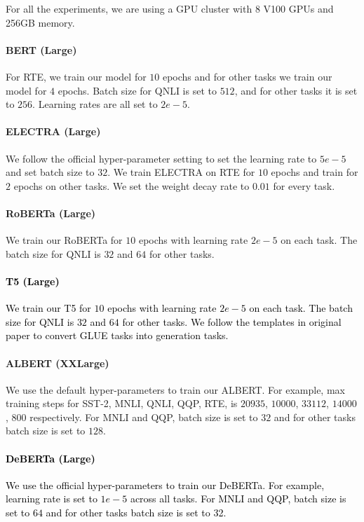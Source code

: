 \documentclass{article}
\newcommand{\m}[1]{{\textcolor{black}{{#1}}}}
\begin{document}
For all the experiments, we are using a GPU cluster with 8 V100 GPUs and 256GB memory.


\paragraph{BERT (Large)} For RTE, we train our model for $10$ epochs and for other tasks we train our model for $4$ epochs. Batch size for QNLI is set to $512$, and for other tasks it is set to $256$. Learning rates are all set to $2e-5$.

\paragraph{ELECTRA (Large)} We follow the official hyper-parameter setting to set the learning rate to $5e-5$ and set batch size to $32$. We train ELECTRA on RTE for $10$ epochs and train for $2$ epochs on other tasks. We set the weight decay rate to $0.01$ for every task.

\paragraph{RoBERTa (Large)} We train our RoBERTa for $10$ epochs with learning rate $2e-5$ on each task. The batch size for QNLI is $32$ and $64$ for other tasks.

\paragraph{\m{T5 (Large)}} \m{We train our T5 for $10$ epochs with learning rate $2e-5$ on each task. The batch size for QNLI is $32$ and $64$ for other tasks. We follow the templates in original paper to convert GLUE tasks into generation tasks.}

\paragraph{ALBERT (XXLarge)} We use the default hyper-parameters to train our ALBERT. For example, max training steps for SST-2, MNLI, QNLI, QQP, RTE, is $20935$, $10000$, $33112$, $14000$, $800$ respectively. For MNLI and QQP, batch size is set to $32$ and for other tasks batch size is set to $128$.

\paragraph{\m{DeBERTa (Large)}} \m{We use the official hyper-parameters to train our DeBERTa. For example, learning rate is set to $1e-5$ across all tasks. For MNLI and QQP, batch size is set to $64$ and for other tasks batch size is set to 32.}
\end{document}
